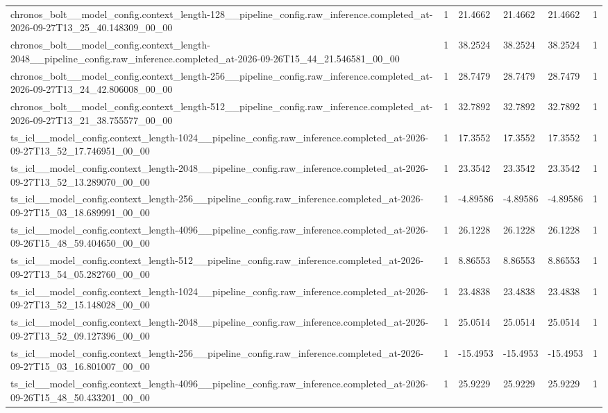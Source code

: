 \begin{tabular}{llllll}
chronos\_bolt\_\_model\_config.context\_length-128\_\_pipeline\_config.raw\_inference.completed\_at-2026-09-27T13\_25\_40.148309\_00\_00 & 1 & 21.4662 & 21.4662 & 21.4662 & 1 \\
chronos\_bolt\_\_model\_config.context\_length-2048\_\_pipeline\_config.raw\_inference.completed\_at-2026-09-26T15\_44\_21.546581\_00\_00 & 1 & 38.2524 & 38.2524 & 38.2524 & 1 \\
chronos\_bolt\_\_model\_config.context\_length-256\_\_pipeline\_config.raw\_inference.completed\_at-2026-09-27T13\_24\_42.806008\_00\_00 & 1 & 28.7479 & 28.7479 & 28.7479 & 1 \\
chronos\_bolt\_\_model\_config.context\_length-512\_\_pipeline\_config.raw\_inference.completed\_at-2026-09-27T13\_21\_38.755577\_00\_00 & 1 & 32.7892 & 32.7892 & 32.7892 & 1 \\
ts\_icl\_\_model\_config.context\_length-1024\_\_pipeline\_config.raw\_inference.completed\_at-2026-09-27T13\_52\_17.746951\_00\_00 & 1 & 17.3552 & 17.3552 & 17.3552 & 1 \\
ts\_icl\_\_model\_config.context\_length-2048\_\_pipeline\_config.raw\_inference.completed\_at-2026-09-27T13\_52\_13.289070\_00\_00 & 1 & 23.3542 & 23.3542 & 23.3542 & 1 \\
ts\_icl\_\_model\_config.context\_length-256\_\_pipeline\_config.raw\_inference.completed\_at-2026-09-27T15\_03\_18.689991\_00\_00 & 1 & -4.89586 & -4.89586 & -4.89586 & 1 \\
ts\_icl\_\_model\_config.context\_length-4096\_\_pipeline\_config.raw\_inference.completed\_at-2026-09-26T15\_48\_59.404650\_00\_00 & 1 & 26.1228 & 26.1228 & 26.1228 & 1 \\
ts\_icl\_\_model\_config.context\_length-512\_\_pipeline\_config.raw\_inference.completed\_at-2026-09-27T13\_54\_05.282760\_00\_00 & 1 & 8.86553 & 8.86553 & 8.86553 & 1 \\
ts\_icl\_\_model\_config.context\_length-1024\_\_pipeline\_config.raw\_inference.completed\_at-2026-09-27T13\_52\_15.148028\_00\_00 & 1 & 23.4838 & 23.4838 & 23.4838 & 1 \\
ts\_icl\_\_model\_config.context\_length-2048\_\_pipeline\_config.raw\_inference.completed\_at-2026-09-27T13\_52\_09.127396\_00\_00 & 1 & 25.0514 & 25.0514 & 25.0514 & 1 \\
ts\_icl\_\_model\_config.context\_length-256\_\_pipeline\_config.raw\_inference.completed\_at-2026-09-27T15\_03\_16.801007\_00\_00 & 1 & -15.4953 & -15.4953 & -15.4953 & 1 \\
ts\_icl\_\_model\_config.context\_length-4096\_\_pipeline\_config.raw\_inference.completed\_at-2026-09-26T15\_48\_50.433201\_00\_00 & 1 & 25.9229 & 25.9229 & 25.9229 & 1 \\

\end{tabular}
